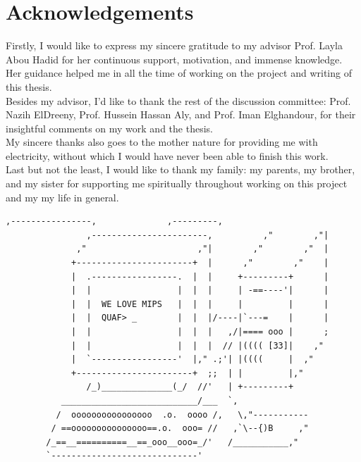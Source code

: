 \documentclass[oneside]{book}
\begin{document}

\newpage
\thispagestyle{plain}
\chapter{Acknowledgements}

Firstly, I would like to express my sincere gratitude to my advisor
Prof. Layla Abou Hadid for her continuous support, motivation, and
immense knowledge. Her guidance helped me in all the time of working
on the project and writing of this thesis. \\

Besides my advisor, I'd like to thank the rest of the discussion committee:
Prof. Nazih ElDreeny,
Prof. Hussein Hassan Aly, and
Prof. Iman Elghandour,
for their insightful comments on my work and the thesis.\\

My sincere thanks also goes to the mother nature for providing me
with electricity, without which I would have never been able to
finish this work.\\

Last but not the least, I would like to thank my family: my parents,
my brother, and my sister for supporting me spiritually throughout working
on this project and my my life in general.


\newpage
\thispagestyle{plain}
\vspace*{\fill}
\bfseries
\begin{Verbatim}[showspaces=false,fontsize=\small]
                     ,----------------,              ,---------,
                ,-----------------------,          ,"        ,"|
              ,"                      ,"|        ,"        ,"  |
             +-----------------------+  |      ,"        ,"    |
             |  .-----------------.  |  |     +---------+      |
             |  |                 |  |  |     | -==----'|      |
             |  |  WE LOVE MIPS   |  |  |     |         |      |
             |  |  QUAF> _        |  |  |/----|`---=    |      |
             |  |                 |  |  |   ,/|==== ooo |      ;
             |  |                 |  |  |  // |(((( [33]|    ,"
             |  `-----------------'  |," .;'| |((((     |  ,"
             +-----------------------+  ;;  | |         |,"
                /_)______________(_/  //'   | +---------+
           ___________________________/___  `,
          /  oooooooooooooooo  .o.  oooo /,   \,"-----------
         / ==ooooooooooooooo==.o.  ooo= //   ,`\--{)B     ,"
        /_==__==========__==_ooo__ooo=_/'   /___________,"
        `-----------------------------'
\end{Verbatim}
\normalfont
\vspace*{\fill}
\end{document}
